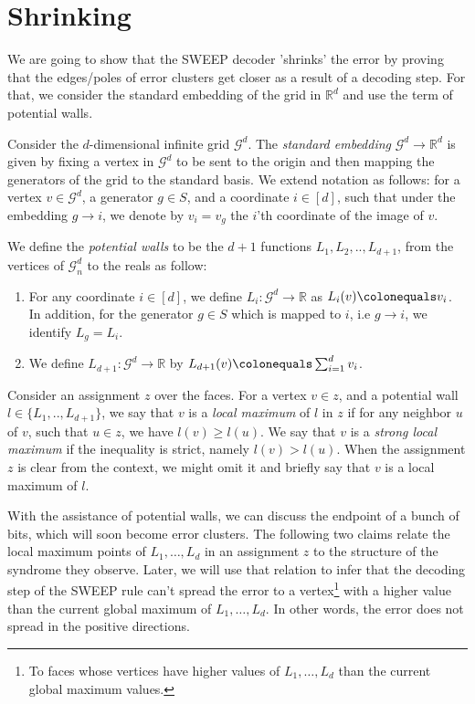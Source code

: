 \section{Shrinking}
We are going to show that the SWEEP decoder 'shrinks' the error by proving that the edges/poles of error clusters get closer as a result of a decoding step. For that, we consider the standard embedding of the grid in $\mathbb{R}^{d}$ and use the term of potential walls.
\begin{definition}
  Consider the $d$-dimensional infinite grid $\mathcal{G}^{d}$. The \textit{standard embedding} $\mathcal{G}^{d} \rightarrow \mathbb{R}^{d}$ is given by fixing a vertex in $\mathcal{G}^{d}$ to be sent to the origin and then mapping the generators of the grid to the standard basis. We extend notation as follows: for a vertex $v \in \mathcal{G}^{d}$, a generator $g \in S$, and a coordinate $i \in [d]$, such that under the embedding $g \rightarrow i$, we denote by $v_{i} = v_{g}$ the $i$'th coordinate of the image of $v$.
\end{definition}

\begin{definition}
  We define the \textit{potential walls} to be the $d+1$ functions $L_{1},L_{2},..,L_{d+1}$, from the vertices of $\mathcal{G}_{n}^{d}$ to the reals as follow:
  \begin{enumerate}
    \item For any coordinate $i \in [d]$, we define $L_{i} \colon \mathcal{G}^{d} \rightarrow \mathbb{R}$ as $L_{i}(v) \colonequals v_{i}$. In addition, for the generator $g \in S$ which is mapped to $i$, i.e $g \rightarrow i $, we identify $L_{g} = L_{i}$. 
    \item We define $L_{d+1} \colon \mathcal{G}^{d} \rightarrow \mathbb{R}$ by $L_{d+1}(v) \colonequals \sum_{i = 1}^{d}v_{i}$.
  \end{enumerate}
  Consider an assignment $z$ over the faces. For a vertex $v \in z$, and a potential wall $l \in \{ L_{1},..,L_{d+1}\} $, we say that $v$ is a \textit{local maximum} of $l$ in $z$ if for any neighbor $u$ of $v$, such that $u \in z$, we have $l(v) \ge l(u)$. We say that $v$ is a \textit{strong local maximum} if the inequality is strict, namely $l(v) > l(u)$. When the assignment $z$ is clear from the context, we might omit it and briefly say that $v$ is a local maximum of $l$.

\end{definition}
With the assistance of potential walls, we can discuss the endpoint of a bunch of bits, which will soon become error clusters. The following two claims relate the local maximum points of $L_{1}, \ldots, L_{d}$ in an assignment $z$ to the structure of the syndrome they observe. Later, we will use that relation to infer that the decoding step of the SWEEP rule can't spread the error to a vertex\footnote{To faces whose vertices have higher values of $L_{1}, \ldots, L_{d}$ than the current global maximum values.} with a higher value than the current global maximum of $L_{1}, \ldots, L_{d}$. In other words, the error does not spread in the positive directions.

